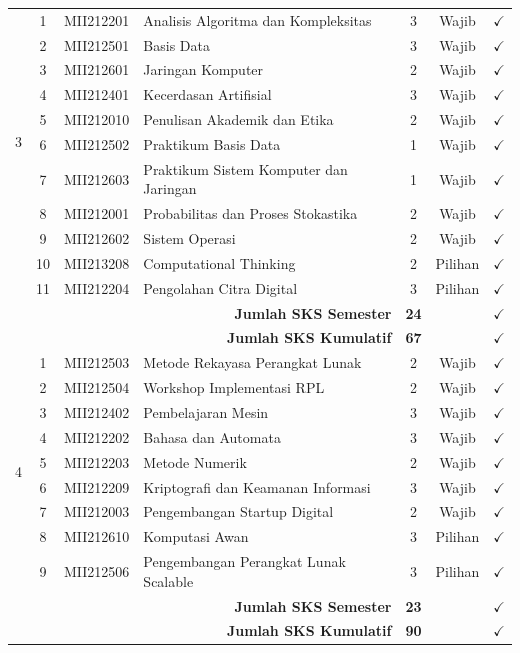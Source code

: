 \documentclass[a4paper,12pt]{article}
\begin{document}
\begin{longtable}{|c|c|l|p{6.5cm}|c|c|c|}
    \multirow{10}{*}{3} 
    & 1 & MII212201 & Analisis Algoritma dan Kompleksitas & 3 & Wajib & $\checkmark$ \\
    & 2 & MII212501 & Basis Data & 3 & Wajib & $\checkmark$ \\
    & 3 & MII212601 & Jaringan Komputer & 2 & Wajib & $\checkmark$ \\
    & 4 & MII212401 & Kecerdasan Artifisial & 3 & Wajib & $\checkmark$ \\
    & 5 & MII212010 & Penulisan Akademik dan Etika & 2 & Wajib & $\checkmark$ \\
    & 6 & MII212502 & Praktikum Basis Data & 1 & Wajib & $\checkmark$ \\
    & 7 & MII212603 & Praktikum Sistem Komputer dan Jaringan & 1 & Wajib & $\checkmark$ \\
    & 8 & MII212001 & Probabilitas dan Proses Stokastika & 2 & Wajib & $\checkmark$ \\
    & 9 & MII212602 & Sistem Operasi & 2 & Wajib & $\checkmark$ \\
    & 10 & MII213208 & Computational Thinking & 2 & Pilihan & $\checkmark$ \\
    & 11 & MII212204 & Pengolahan Citra Digital & 3 & Pilihan & $\checkmark$ \\
    \hline
    \multicolumn{4}{|r|}{\textbf{Jumlah SKS Semester}} & \textbf{24} & & $\checkmark$ \\
    \multicolumn{4}{|r|}{\textbf{Jumlah SKS Kumulatif}} & \textbf{67} & & $\checkmark$ \\
    \hline

    \multirow{9}{*}{4} 
    & 1 & MII212503 & Metode Rekayasa Perangkat Lunak & 2 & Wajib & $\checkmark$ \\
    & 2 & MII212504 & Workshop Implementasi RPL & 2 & Wajib & $\checkmark$ \\
    & 3 & MII212402 & Pembelajaran Mesin & 3 & Wajib & $\checkmark$ \\
    & 4 & MII212202 & Bahasa dan Automata & 3 & Wajib & $\checkmark$ \\
    & 5 & MII212203 & Metode Numerik & 2 & Wajib & $\checkmark$ \\
    & 6 & MII212209 & Kriptografi dan Keamanan Informasi & 3 & Wajib & $\checkmark$ \\
    & 7 & MII212003 & Pengembangan Startup Digital & 2 & Wajib & $\checkmark$ \\
    & 8 & MII212610 & Komputasi Awan & 3 & Pilihan & $\checkmark$ \\
    & 9 & MII212506 & Pengembangan Perangkat Lunak Scalable & 3 & Pilihan & $\checkmark$ \\
    \hline
    \multicolumn{4}{|r|}{\textbf{Jumlah SKS Semester}} & \textbf{23} & & $\checkmark$ \\
    \multicolumn{4}{|r|}{\textbf{Jumlah SKS Kumulatif}} & \textbf{90} & & $\checkmark$ \\
    \hline


\end{longtable}
\end{document}
